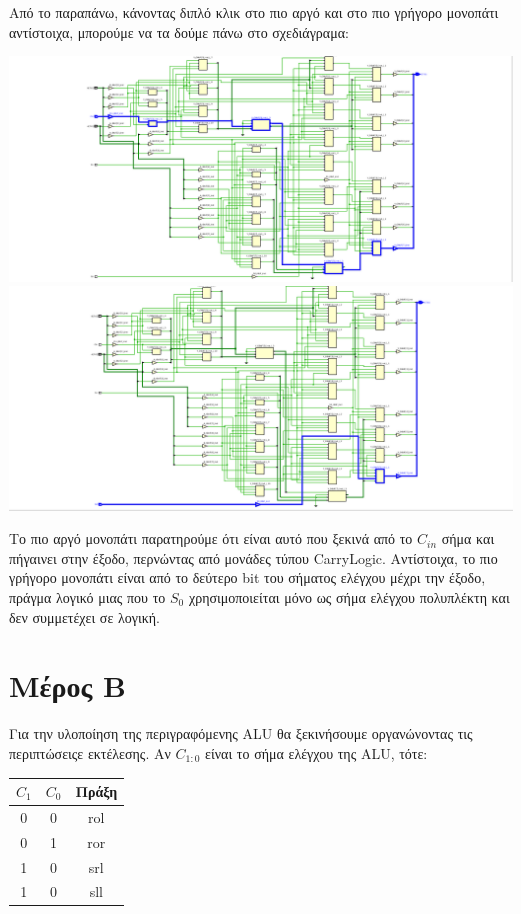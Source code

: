 \documentclass[11pt, a4paper]{report}
\begin{document}
Από το παραπάνω, κάνοντας διπλό κλικ στο πιο αργό και στο πιο γρήγορο μονοπάτι αντίστοιχα, μπορούμε να τα δούμε πάνω στο σχεδιάγραμα:
\begin{center}
	\includegraphics[width=\textwidth]{./images/alu-1/Slowest_Path.png}
	\includegraphics[width=\textwidth]{./images/alu-1/Fastest_Path.png}
\end{center}


Το πιο αργό μονοπάτι παρατηρούμε ότι είναι αυτό που ξεκινά από το $C_{in}$ σήμα και πήγαινει στην έξοδο, περνώντας από μονάδες τύπου CarryLogic.
Αντίστοιχα, το πιο γρήγορο μονοπάτι είναι από το δεύτερο bit του σήματος ελέγχου μέχρι την έξοδο, πράγμα λογικό μιας που το $S_0$ χρησιμοποιείται μόνο ως σήμα ελέγχου πολυπλέκτη και δεν συμμετέχει σε λογική.

\section{Μέρος Β}
Για την υλοποίηση της περιγραφόμενης ALU θα ξεκινήσουμε οργανώνοντας τις περιπτώσειςε εκτέλεσης.
Αν $C_{1:0}$ είναι το σήμα ελέγχου της ALU, τότε:
\begin{center}
  \begin{tabular}{|c|c|c|}
    \hline
    $C_1$ & $C_0$ & Πράξη \\
    \hline
    0 & 0 & rol \\
    0 & 1 & ror \\
    1 & 0 & srl \\
    1 & 0 & sll \\
    \hline
  \end{tabular}
\end{center}
\end{document}
